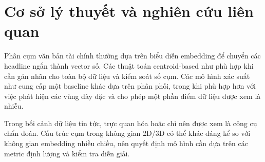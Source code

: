 \section{Cơ sở lý thuyết và nghiên cứu liên quan}

Phân cụm văn bản tài chính thường dựa trên biểu diễn embedding để chuyển các headline ngắn thành vector số. Các thuật toán centroid-based như  phù hợp khi cần gán nhãn cho toàn bộ dữ liệu và kiểm soát số cụm. Các mô hình xác suất như  cung cấp một baseline khác dựa trên phân phối, trong khi  phù hợp hơn với việc phát hiện các vùng dày đặc và cho phép một phần điểm dữ liệu được xem là nhiễu.

Trong bối cảnh dữ liệu tin tức, trực quan hóa  hoặc  chỉ nên được xem là công cụ chẩn đoán. Cấu trúc cụm trong không gian 2D/3D có thể khác đáng kể so với không gian embedding nhiều chiều, nên quyết định mô hình cần dựa trên các metric định lượng và kiểm tra diễn giải.
